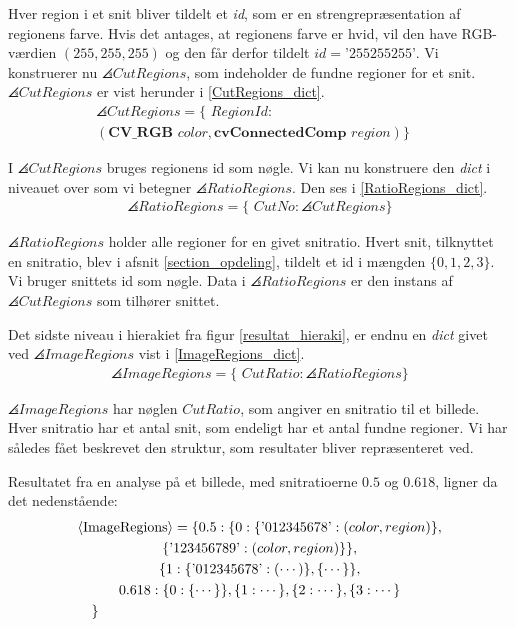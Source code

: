 {Hver region i et snit bliver tildelt et \emph{id}, som er en
strengrepræsentation af regionens farve.  Hvis det antages, at regionens
farve er hvid, vil den have RGB-værdien $(255, 255, 255)$ og den får
derfor tildelt $id = \textrm{'255255255'}$. Vi konstruerer nu
$\angles{CutRegions}$, som indeholder de fundne regioner for et snit.
$\angles{CutRegions}$ er vist herunder i \eqref{CutRegions_dict}.
\begin{multline}
    \angles{CutRegions} = \{ \textit{~RegionId} : \\
    (\textbf{CV\_RGB~}\textit{color}, \textbf{cvConnectedComp~}\textit{region}) \}\quad
    \label{CutRegions_dict}
\end{multline}

\noindent I $\angles{CutRegions}$ bruges regionens id som nøgle. Vi kan nu
konstruere den \emph{dict} i niveauet over som vi betegner
$\angles{RatioRegions}$. Den ses i \eqref{RatioRegions_dict}.
\begin{eqnarray}
    \angles{RatioRegions} = \{ \textit{~CutNo} : \angles{CutRegions} \}
    \label{RatioRegions_dict}
\end{eqnarray}

\noindent $\angles{RatioRegions}$ holder alle regioner for en givet
snitratio.  Hvert snit, tilknyttet en snitratio, blev i afsnit
\ref{section_opdeling}, tildelt et id i mængden $\{0,1,2,3\}$. Vi bruger
snittets id som nøgle.  Data i $\angles{RatioRegions}$ er den instans af
$\angles{CutRegions}$ som tilhører snittet.

Det sidste niveau i hierakiet fra figur \ref{resultat_hieraki}, er endnu
en \emph{dict} givet ved $\angles{ImageRegions}$ vist i
\eqref{ImageRegions_dict}.
\begin{eqnarray}
    \angles{ImageRegions} = \{ \textit{~CutRatio} : \angles{RatioRegions} \}
    \label{ImageRegions_dict}
\end{eqnarray}

\noindent $\angles{ImageRegions}$ har nøglen $CutRatio$, som angiver en
snitratio til et billede. Hver snitratio har et antal snit, som endeligt
har et antal fundne regioner. Vi har således fået beskrevet den
struktur, som resultater bliver repræsenteret ved.

Resultatet fra en analyse på et billede, med snitratioerne $0.5$ og
$0.618$, ligner da det nedenstående:
\begin{multline}
    \angles{ImageRegions} = \{ 0.5 : \{ 0 : \{ \textrm{'012345678'} : (color, region) \},\\
                                            \{ \textrm{'123456789'} : (color, region) \}
                                            \},\\
                                            \{ 1 : \{ \textrm{'012345678'} : ( \cdots ) \}, 
                                            \{ \cdots \} \}, \\
                              0.618 : \{ 0 : \{ \cdots \} \}, \{ 1 :
                              \cdots \}, \{ 2 : \cdots \}, \{ 3 : \cdots
                              \} \\
    \shoveleft{\}}\shoveright{}
    \label{CutRegions_dict}
\end{multline}

}
